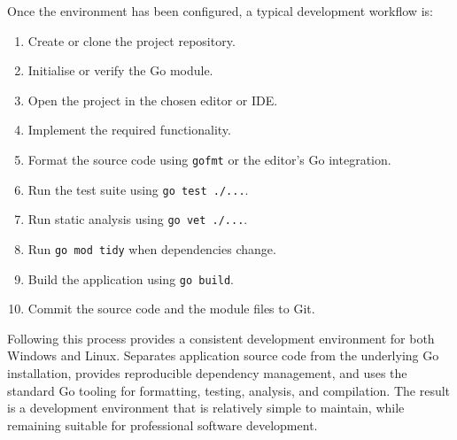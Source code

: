 Once the environment has been configured, a typical development workflow is:

\begin{enumerate}
    \item Create or clone the project repository.
    \item Initialise or verify the Go module.
    \item Open the project in the chosen editor or IDE.
    \item Implement the required functionality.
    \item Format the source code using \texttt{gofmt} or the editor's Go integration.
    \item Run the test suite using \texttt{go test ./...}.
    \item Run static analysis using \texttt{go vet ./...}.
    \item Run \texttt{go mod tidy} when dependencies change.
    \item Build the application using \texttt{go build}.
    \item Commit the source code and the module files to Git.
\end{enumerate}

Following this process provides a consistent development environment for both Windows and Linux. Separates application source code from the underlying Go installation, provides reproducible dependency management, and uses the standard Go tooling for formatting, testing, analysis, and compilation. The result is a development environment that is relatively simple to maintain, while remaining suitable for professional software development.
